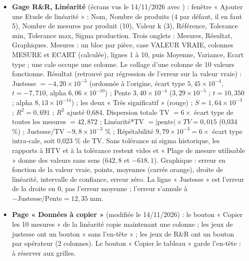 \documentclass[10pt,a4paper]{article}
\begin{document}
\begin{itemize}
\item \textbf{Gage R\&R, Linéarité} (écrans vus le 14/11/2026 avec ) : fenêtre « Ajouter une Etude de linéarité » : Nom, Nombre de produits (4 par défaut, il en faut 5), Nombre de mesures par produit (10), Valeur k (3), Référence, Tolerance min, Tolerance max, Sigma production. Trois onglets : Mesures, Résultat, Graphiques. Mesures : un bloc par pièce, case VALEUR VRAIE, colonnes MESURE et ECART (calculée), lignes 1 à 10, puis Moyenne, Variance, Ecart type ; une cale occupe une colonne. Le collage d'une colonne de 10 valeurs fonctionne. Résultat (retrouvé par régression de l'erreur sur la valeur vraie) : Justesse $= -4{,}20 \times 10^{-3}$ (ordonnée à l'origine, écart type $5{,}45 \times 10^{-4}$, $t = -7{,}710$, alpha $6{,}06 \times 10^{-10}$) ; Pente $3{,}40 \times 10^{-4}$ ($3{,}29 \times 10^{-5}$ ; $t = 10{,}350$ ; alpha $8{,}13 \times 10^{-14}$) ; les deux « Très significatif » (rouge) ; $S = 1{,}64 \times 10^{-3}$ ; $R^2 = 0{,}691$ ; $R^2$ ajusté 0,684. Dispersion totale TV $= 6 \times$ écart type de toutes les mesures $= 42{,}872$ ; Linéarité*TV $= |\text{pente}| \times TV = 0{,}015$ (0,034 \%) ; Justesse/TV $-9{,}8 \times 10^{-3}$ \% ; Répétabilité $9{,}79 \times 10^{-3} = 6 \times$ écart type intra-cale, soit 0,023 \% de TV. Sans tolérance ni sigma historique, les rapports à HTV et à la tolérance restent vides et « Plage de mesure utilisable » donne des valeurs sans sens ($642{,}8$ et $-618{,}1$). Graphique : erreur en fonction de la valeur vraie, points, moyennes (carrés orange), droite de linéarité, intervalle de confiance, erreur zéro. La ligne « Justesse » est l'erreur de la droite en 0, pas l'erreur moyenne ; l'erreur s'annule à $-\text{Justesse}/\text{Pente} = 12{,}35$ mm.
\item \textbf{Page « Données à copier »} (modifiée le 14/11/2026) : le bouton « Copier les 10 mesures » de la linéarité copie maintenant une colonne ; les jeux de justesse ont un bouton « sans l'en-tête » ; les jeux de R\&R ont un bouton par opérateur (2 colonnes). Le bouton « Copier le tableau » garde l'en-tête : à réserver aux grilles.

\end{itemize}
\end{document}
